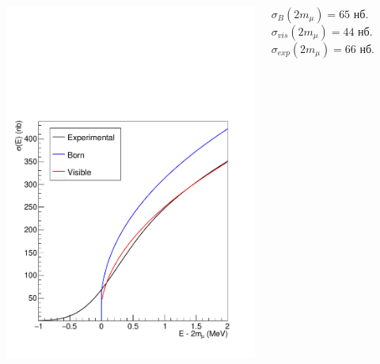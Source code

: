 \documentclass[10pt, pdf, hyperref={unicode}]{beamer}
\begin{document}
\begin{frame}
\begin{minipage}{\linewidth}
\begin{columns}
\begin{column}{0.6\linewidth}
\centering
\includegraphics[scale = 0.38]{secs.pdf}
\par
\end{column}

\begin{column}{0.4\linewidth}
$\sigma_B(2m_{\mu}) = 65$ нб.
$\sigma_{vis}(2m_{\mu}) = 44$ нб.
$\sigma_{exp}(2m_{\mu}) = 66$ нб.
\end{column}
\end{columns}
\end{minipage}
\end{frame}
\end{document}
